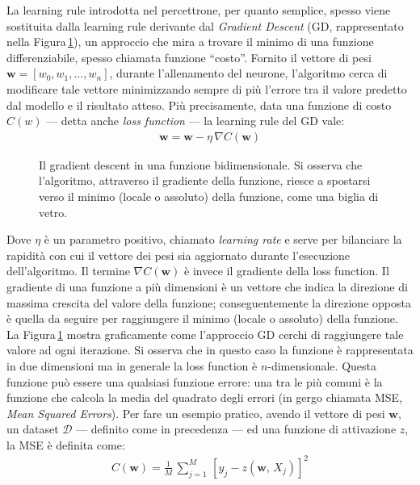 La learning rule introdotta nel percettrone, per quanto semplice, spesso viene sostituita dalla learning rule derivante dal \textit{Gradient Descent} (\acs{GD}, rappresentato nella Figura\,\ref{fig:gradient-descent}), un approccio che mira a trovare il minimo di una funzione differenziabile, spesso chiamata funzione ``costo''. Fornito il vettore di pesi $\mathbf{w} = \left[w_0, w_1, \dots, w_n \right]$, durante l'allenamento del neurone, l'algoritmo cerca di modificare tale vettore minimizzando sempre di più l'errore tra il valore predetto dal modello e il risultato atteso. Più precisamente, data una funzione di costo $C(w)$ — detta anche \textit{loss function} — la learning rule del \acs{GD} vale:
% 
\begin{gather*}
    \mathbf{w} = \mathbf{w} - \eta\,\nabla C\left(\mathbf{w}\right)
\end{gather*}
% 
\begin{figure}[!b]
    \centering
    
    \caption[Il gradient descent in una funzione bidimensionale.]{Il gradient descent in una funzione bidimensionale. Si osserva che l'algoritmo, attraverso il gradiente della funzione, riesce a spostarsi verso il minimo (locale o assoluto) della funzione, come una biglia di vetro.}\label{fig:gradient-descent}
\end{figure}
% 
\noindent Dove $\eta$ è un parametro positivo, chiamato \textit{learning rate} e serve per bilanciare la rapidità con cui il vettore dei pesi sia aggiornato durante l'esecuzione dell'algoritmo. Il termine $\nabla C\left(\mathbf{w}\right)$ è invece il gradiente della loss function. Il gradiente di una funzione a più dimensioni è un vettore che indica la direzione di massima crescita del valore della funzione; conseguentemente la direzione opposta è quella da seguire per raggiungere il minimo (locale o assoluto) della funzione. La Figura\,\ref{fig:gradient-descent} mostra graficamente come l'approccio \acs{GD} cerchi di raggiungere tale valore ad ogni iterazione. Si osserva che in questo caso la funzione è rappresentata in due dimensioni ma in generale la loss function è $n$-dimensionale. Questa funzione può essere una qualsiasi funzione errore: una tra le più comuni è la funzione che calcola la media del quadrato degli errori (in gergo chiamata \acs{MSE}, \textit{Mean Squared Errors}). Per fare un esempio pratico, avendo il vettore di pesi $\mathbf{w}$, un dataset $\mathcal{D}$ — definito come in precedenza — ed una funzione di attivazione $z$, la \acs{MSE} è definita come:
% 
\begin{gather*}
    C(\mathbf{w}) = \frac{1}{M}\,\sum_{j = 1}^M\,{\left[ y_j - z(\mathbf{w},\,X_j) \right]}^2
\end{gather*}
